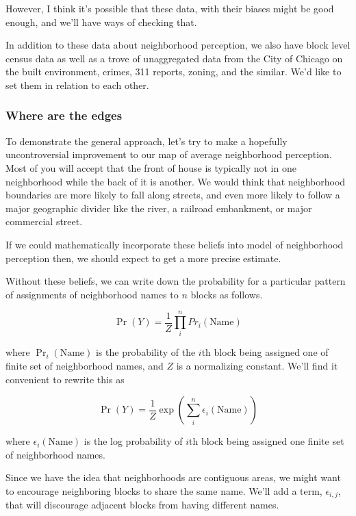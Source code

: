 \documentclass{article}
\begin{document}
However, I think it's possible that these data, with their biases
might be good enough, and we'll have ways of checking that. 

In addition to these data about neighborhood perception, we also have
block level census data as well as a trove of unaggregated data from
the City of Chicago on the built environment, crimes, 311 reports,
zoning, and the similar. We'd like to set them in relation to each
other.

\subsubsection*{Where are the edges}
To demonstrate the general approach, let's try to make a hopefully
uncontroversial improvement to our map of average neighborhood
perception. Most of you will accept that the front of house is
typically not in one neighborhood while the back of it is another. We
would think that neighborhood boundaries are more likely to fall along
streets, and even more likely to follow a major geographic divider
like the river, a railroad embankment, or major commercial street.

If we could mathematically incorporate these beliefs into model of
neighborhood perception then, we should expect to get a more precise
estimate.

Without these beliefs, we can write down the probability for a
particular pattern of assignments of neighborhood names to $n$ blocks as
follows.

\begin{equation}
\Pr(Y)= \frac{1}{Z}\prod_i^nPr_i(\text{Name}) 
\end{equation}

where $\Pr_i(\text{Name})$ is the probability of the $i$th block being
assigned one of finite set of neighborhood names, and $Z$ is a
normalizing constant. We'll find it convenient to rewrite this as

\begin{equation}
\Pr(Y) = \frac{1}{Z}\operatorname{exp}\left(\sum_i^n\epsilon_i(\text{Name})\right) 
\end{equation}

where $\epsilon_i(\text{Name})$ is the log probability of $i$th block
being assigned one finite set of neighborhood names.

Since we have the idea that neighborhoods are contiguous areas, we might
want to encourage neighboring blocks to share the same name. We'll add
a term, $\epsilon_{i,j}$, that will discourage adjacent blocks from
having different names.
\end{document}
